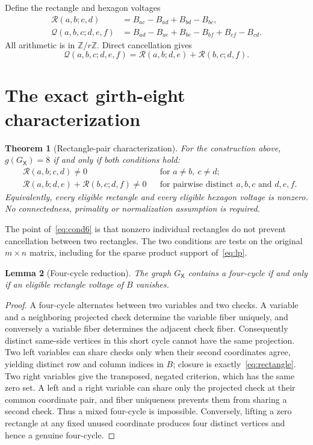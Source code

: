\documentclass[11pt]{article}
\newtheorem{theorem}{Theorem}[section]
\newtheorem{lemma}[theorem]{Lemma}
\theoremstyle{definition}
\theoremstyle{remark}
\newcommand{\Zr}{\mathbb Z/r\mathbb Z}
\newcommand{\GX}{G_{\mathsf X}}
\newcommand{\R}{\mathcal R}
\newcommand{\Q}{\mathcal Q}
\begin{document}
Define the rectangle and hexagon voltages
\begin{align}
 \R(a,b;c,d)&=B_{ac}-B_{ad}+B_{bd}-B_{bc},\label{eq:rectangle}\\
 \Q(a,b,c;d,e,f)&=B_{ad}-B_{ae}+B_{be}-B_{bf}+B_{cf}-B_{cd}.
 \label{eq:hexagon}
\end{align}
All arithmetic is in $\Zr$. Direct cancellation gives
\begin{equation}\label{eq:pair}
 \Q(a,b,c;d,e,f)=\R(a,b;d,e)+\R(b,c;d,f).
\end{equation}

\section{The exact girth-eight characterization}\label{sec:main}

\begin{theorem}[Rectangle-pair characterization]\label{thm:main}
For the construction above, $g(\GX)=8$ if and only if both conditions hold:
\begin{align}
 &\R(a,b;c,d)\ne0
 &&\text{for }a\ne b,\ c\ne d;\label{eq:cond4}\\
 &\R(a,b;d,e)+\R(b,c;d,f)\ne0
 &&\text{for pairwise distinct }a,b,c\text{ and }d,e,f.
 \label{eq:cond6}
\end{align}
Equivalently, every eligible rectangle and every eligible hexagon voltage
is nonzero. No connectedness, primality or normalization assumption is
required.
\end{theorem}

The point of~\eqref{eq:cond6} is that nonzero individual rectangles do not
prevent cancellation between two rectangles. The two conditions are tests
on the original $m\times n$ matrix, including for the sparse product support
of~\eqref{eq:lp}.

\begin{lemma}[Four-cycle reduction]\label{lem:four}
The graph $\GX$ contains a four-cycle if and only if an eligible rectangle
voltage of $B$ vanishes.
\end{lemma}
\begin{proof}
A four-cycle alternates between two variables and two checks. A variable
and a neighboring projected check determine the variable fiber uniquely,
and conversely a variable fiber determines the adjacent check fiber.
Consequently distinct same-side vertices in this short cycle cannot have
the same projection. Two left variables can share checks only when their
second coordinates agree, yielding distinct row and column indices in
$B$; closure is exactly~\eqref{eq:rectangle}. Two right variables give the
transposed, negated criterion, which has the same zero set. A left and a
right variable can share only the projected check at their common
coordinate pair, and fiber uniqueness prevents them from sharing a second
check. Thus a mixed four-cycle is impossible. Conversely, lifting a zero
rectangle at any fixed unused coordinate produces four distinct vertices
and hence a genuine four-cycle.
\end{proof}
\end{document}
